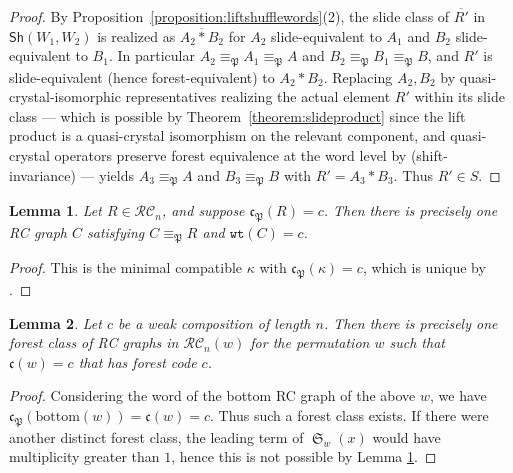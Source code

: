 \documentclass{amsart}
\newtheorem{lemma}{Lemma}[subsection]
\theoremstyle{definition}
\theoremstyle{remark}
\numberwithin{equation}{subsection}
\DeclareMathOperator{\sch}{\mathfrak{S}}
\newcommand{\wtt}{\mathtt{wt}}
\newcommand{\RC}{\mathcal{RC}}
\newcommand{\code}{\mathfrak{c}}
\newcommand{\forest}{\mathfrak{P}}
\begin{document}
\begin{proof}
By Proposition~\ref{proposition:liftshufflewords}(2), the slide class of $\overline{R'}$ in $\mathsf{Sh}(W_1,W_2)$ is realized as $\overline{A_2*B_2}$ for $A_2$ slide-equivalent to $A_1$ and $B_2$ slide-equivalent to $B_1$. In particular $A_2\equiv_\forest A_1\equiv_\forest A$ and $B_2\equiv_\forest B_1\equiv_\forest B$, and $R'$ is slide-equivalent (hence forest-equivalent) to $A_2*B_2$. Replacing $A_2,B_2$ by quasi-crystal-isomorphic representatives realizing the actual element $R'$ within its slide class --- which is possible by Theorem~\ref{theorem:slideproduct} since the lift product is a quasi-crystal isomorphism on the relevant component, and quasi-crystal operators preserve forest equivalence at the word level by \cite[Proposition~5.8]{nadeau2024forest} (shift-invariance) --- yields $A_3\equiv_\forest A$ and $B_3\equiv_\forest B$ with $R'=A_3*B_3$. Thus $R'\in S$.
\end{proof}



\begin{lemma} \label{lemma:forestlead}
Let $R\in \RC_n$, and suppose $\code_\forest(R) = c$. Then there is precisely one RC graph $C$ satisfying $C\equiv_\forest R$ and $\wtt(C) = c$.
\end{lemma}
\begin{proof}
This is the minimal compatible $\kappa$ with $\code_\forest(\kappa) = c$, which is unique by \cite[Lemma~3.12]{nadeau2024forest}.
\end{proof}

\begin{lemma} \label{lemma:forestchoice}
  Let $c$ be a weak composition of length $n$. Then there is precisely one forest class of RC graphs in $\RC_n(w)$ for the permutation $w$ such that $\code(w)=c$ that has forest code $c$.
\end{lemma}
\begin{proof}
Considering the word of the bottom RC graph of the above $w$, we have $\code_\forest(\mathrm{bottom}(w)) = \code(w) = c$. Thus such a forest class exists. If there were another distinct forest class, the leading term of $\sch_w(x)$ would have multiplicity greater than $1$, hence this is not possible by Lemma \ref{lemma:forestlead}.
\end{proof}
\end{document}
